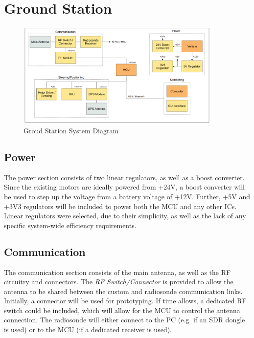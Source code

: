 \graphicspath{{./figures}}

\section{Ground Station}

\begin{figure}[!htb]
  \centering
  \includegraphics[width=0.9\textwidth]{gs_system}
  \caption{Groud Station System Diagram}
  \label{fig:gs_system}
\end{figure}

\subsection{Power}
The power section consists of two linear regulators, as well as a boost converter. Since the existing motors are ideally powered from +24V, a boost converter will be used to step up the voltage from a battery voltage of +12V. Further, +5V and +3V3 regulators will be included to power both the MCU and any other ICs. Linear regulators were selected, due to their simplicity, as well as the lack of any specific system-wide efficiency requirements.

\subsection{Communication}
The communication section consists of the main antenna, as well as the RF circuitry and connectors. The \textit{RF Switch/Connector} is provided to allow the antenna to be shared between the custom and radiosonde communication links. Initially, a connector will be used for prototyping. If time allows, a dedicated RF switch could be included, which will allow for the MCU to control the antenna connection. The radiosonde will either connect to the PC (e.g. if an SDR dongle is used) or to the MCU (if a dedicated receiver is used).

